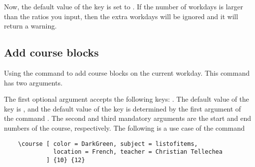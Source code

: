 \documentclass[letterpaper]{l3doc}
\newenvironment{example}{\begin{list}{}{\leftmargin=3em}\item }{\end{list}}
\begin{document}
\begin{figure}[!ht]
    \centering
\end{figure}

Now, the default value of the key  is set to . If the number of workdays is larger than the ratios you input, then the extra workdays will be ignored and it will return a warning.

\subsection{Add course blocks}

Using the  command to add course blocks on the current workday. This command has two arguments.

\begin{example}
\end{example}

The first optional argument accepts the following keys:     . The default value of the key  is , and the default value of the key  is determined by the first argument of the command . The second and third mandatory arguments are the start and end numbers of the course, respectively. The following is a use case of the command 

\begin{Verbatim}
    \course [ color = DarkGreen, subject = listofitems, 
              location = French, teacher = Christian Tellechea
            ] {10} {12}
\end{Verbatim}
\end{document}
